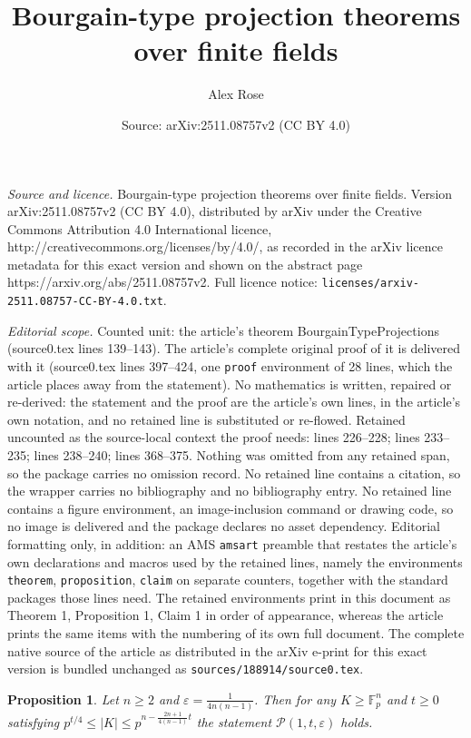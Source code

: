 \documentclass[10pt,a4paper]{amsart}
\title{Bourgain-type projection theorems over finite fields}
\author{Alex Rose}
\date{Source: arXiv:2511.08757v2 (CC BY 4.0)}
\newtheorem{proposition}{Proposition}
\newcommand{\F}{\mathbb F}
\begin{document}
\maketitle

\noindent\emph{Source and licence.} Bourgain-type projection theorems over finite fields. Version arXiv:2511.08757v2 (CC BY 4.0), distributed by arXiv under the Creative Commons Attribution 4.0 International licence, http://creativecommons.org/licenses/by/4.0/, as recorded in the arXiv licence metadata for this exact version and shown on the abstract page https://arxiv.org/abs/2511.08757v2. Full licence notice: \texttt{licenses/arxiv-2511.08757-CC-BY-4.0.txt}.\par\smallskip

\noindent\textit{Editorial scope.} Counted unit: the article's theorem BourgainTypeProjections (source0.tex lines 139--143). The article's complete original proof of it is delivered with it (source0.tex lines 397--424, one \texttt{proof} environment of 28 lines, which the article places away from the statement). No mathematics is written, repaired or re-derived: the statement and the proof are the article's own lines, in the article's own notation, and no retained line is substituted or re-flowed.  Retained uncounted as the source-local context the proof needs: lines 226--228; lines 233--235; lines 238--240; lines 368--375.  Nothing was omitted from any retained span, so the package carries no omission record.  No retained line contains a citation, so the wrapper carries no bibliography and no bibliography entry.  No retained line contains a figure environment, an image-inclusion command or drawing code, so no image is delivered and the package declares no asset dependency.  Editorial formatting only, in addition: an AMS \texttt{amsart} preamble that restates the article's own declarations and macros used by the retained lines, namely the environments \texttt{theorem}, \texttt{proposition}, \texttt{claim} on separate counters, together with the standard packages those lines need.  The retained environments print in this document as Theorem 1, Proposition 1, Claim 1 in order of appearance, whereas the article prints the same items with the numbering of its own full document.  The complete native source of the article as distributed in the arXiv e-print for this exact version is bundled unchanged as \texttt{sources/188914/source0.tex}.
\begin{proposition}\label{baseCase}
    Let $n \geq 2$ and $\varepsilon = \frac{1}{4n(n - 1)}$. Then for any $K \geq \F_p^n$ and $t \geq 0$ satisfying $p^{t/4} \leq |K| \leq p^{n - \frac{2n + 1}{4(n - 1)}t}$ the statement $\mathcal{P}(1, t, \varepsilon)$ holds. 
\end{proposition}
\end{document}
